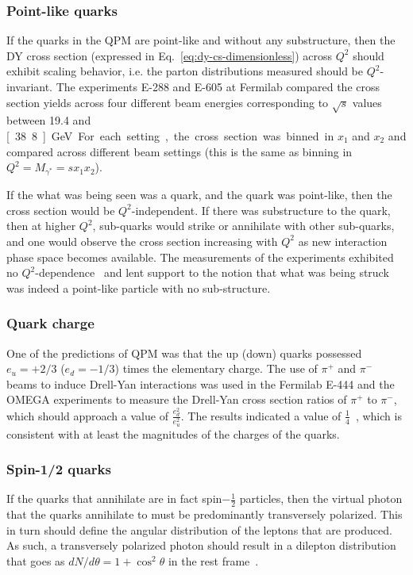 \subsubsection{Point-like quarks}

If the quarks in the QPM are point-like and without any substructure, then the DY cross section (expressed in Eq.~\ref{eq:dy-cs-dimensionless}) across $Q^2$ should exhibit scaling behavior, i.e. the parton distributions measured should be $Q^2$-invariant. The experiments E-288 and E-605 at Fermilab compared the cross section yields across four different beam energies corresponding to $\sqrt{s}$ values between 19.4 and \unit[38.8]{GeV}. For each setting, the cross section was binned in $x_1$ and $x_2$ and compared across different beam settings (this is the same as binning in $Q^2=M_{\gamma^*}=sx_1x_2$).

If the what was being seen was a quark, and the quark was point-like, then the cross section would be $Q^2$-independent. If there was substructure to the quark, then at higher $Q^2$, sub-quarks would strike or annihilate with other sub-quarks, and one would observe the cross section increasing with $Q^2$ as new interaction phase space becomes available. The measurements of the experiments exhibited no $Q^2$-dependence~\cite{PhysRevD.23.604, Brown:1989fj} and lent support to the notion that what was being struck was indeed a point-like particle with no sub-structure.

\subsubsection{Quark charge}

One of the predictions of QPM was that the up (down) quarks possessed $e_u=+2/3$ ($e_d=-1/3$) times the elementary charge. The use of $\pi^+$ and $\pi^-$ beams to induce Drell-Yan interactions was used in the Fermilab E-444 and the OMEGA experiments to measure the Drell-Yan cross section ratios of $\pi^+$ to $\pi^-$, which should approach a value of $\frac{e^2_d}{e^2_u}$. The results indicated a value of $\frac{1}{4}$~\cite{GrossoPilcher:1986nk, Hogan:1979tu}, which is consistent with at least the magnitudes of the charges of the quarks.

\subsubsection{Spin-1/2 quarks}

If the quarks that annihilate are in fact spin$-\frac{1}{2}$ particles, then the virtual photon that the quarks annihilate to must be predominantly transversely polarized. This in turn should define the angular distribution of the leptons that are produced. As such, a transversely polarized photon should result in a dilepton distribution that goes as $dN/d\theta = 1+\cos^2\theta$ in the rest frame~\cite{Kenyon:1982tg}.

